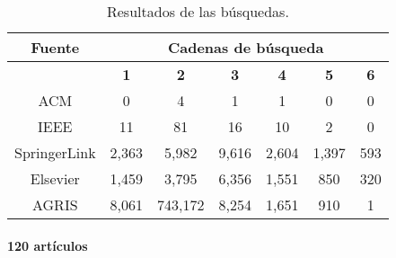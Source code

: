 \documentclass[10pt, twocolumn]{article}
\begin{document}
\begin{table}[]
\centering
\begin{tabular}{|c|c|c|c|c|c|c|}
\hline
\multicolumn{1}{|c|}{\textbf{Fuente}} & \multicolumn{6}{c|}{\textbf{Cadenas de búsqueda}}                                                                                                                                                         \\ \hline
                                      & \multicolumn{1}{c|}{\textbf{1}} & \multicolumn{1}{c|}{\textbf{2}} & \multicolumn{1}{c|}{\textbf{3}} & \multicolumn{1}{c|}{\textbf{4}} & \multicolumn{1}{c|}{\textbf{5}} & \multicolumn{1}{c|}{\textbf{6}} \\ \hline
ACM                                   & 0                              & 4                              & 1                              & 1                              & 0                              & 0                              \\ \hline
IEEE                                  & 11                              & 81                              & 16                              & 10                              & 2                              & 0                              \\ \hline
SpringerLink                          & 2,363                              & 5,982                              & 9,616                         	     & 2,604                              & 1,397                              & 593                              \\ \hline
Elsevier                              & 1,459                              & 3,795                              & 6,356                              & 1,551                              & 850                              & 320                              \\ \hline
AGRIS                                 & 8,061                              & 743,172                              & 8,254                              & 1,651                              & 910                              & 1                              \\ \hline
\end{tabular}
\caption{Resultados de las búsquedas.}
\label{tabla:busquedas}
\end{table}

\paragraph{120 artículos}
\end{document}

